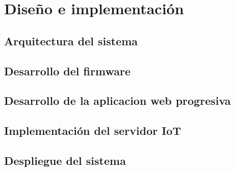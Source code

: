 \chapter{Diseño e implementación} %

\section{Arquitectura del sistema}

\section{Desarrollo del firmware}

\section{Desarrollo de la aplicacion web progresiva}

\section{Implementación del servidor IoT}

\section{Despliegue del sistema}



